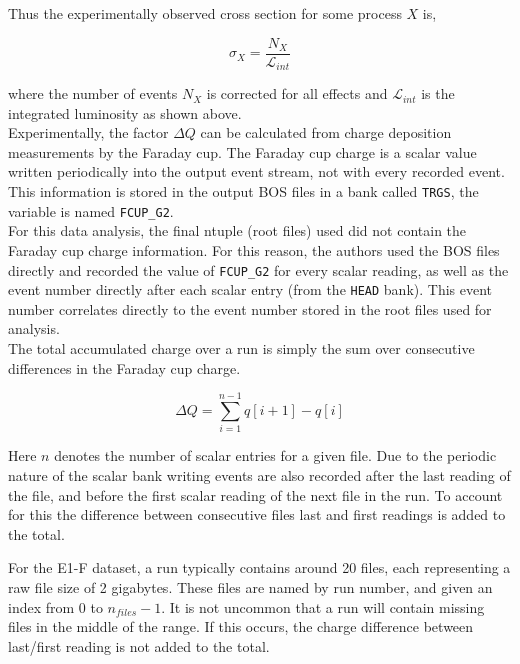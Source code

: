 Thus the experimentally observed cross section for some process $X$ is,

\begin{equation}
	\sigma_{X} = \frac{N_{X}}{\mathcal{L}_{int}}
\end{equation}

where the number of events $N_X$ is corrected for all effects and $\mathcal{L}_{int}$ is the integrated luminosity as shown above. \\

Experimentally, the factor $\Delta Q$ can be calculated from charge deposition measurements by the Faraday cup.  The Faraday cup charge is a scalar value written periodically into the output event stream, not with every recorded event.  This information is stored in the output BOS files in a bank called \texttt{TRGS}, the variable is named \texttt{FCUP\_G2}.  \\

For this data analysis, the final ntuple (root files) used did not contain the Faraday cup charge information.  For this reason, the authors used the BOS files directly and recorded the value of \texttt{FCUP\_G2} for every scalar reading, as well as the event number directly after each scalar entry (from the \texttt{HEAD} bank).  This event number correlates directly to the event number stored in the root files used for analysis. \\

The total accumulated charge over a run is simply the sum over consecutive differences in the Faraday cup charge.

\begin{equation}
	\Delta Q = \sum_{i=1}^{n-1} q[i+1]-q[i] 	
\end{equation}

Here $n$ denotes the number of scalar entries for a given file.  Due to the periodic nature of the scalar bank writing events are also recorded after the last reading of the file, and before the first scalar reading of the next file in the run.  To account for this the difference between consecutive files last and first readings is added to the total. \\


For the E1-F dataset, a run typically contains around 20 files, each representing a raw file size of 2 gigabytes.  These files are named by run number, and given an index from $0$ to $n_{files}-1$.  It is not uncommon that a run will contain missing files in the middle of the range.  If this occurs, the charge difference between last/first reading is not added to the total. \\

